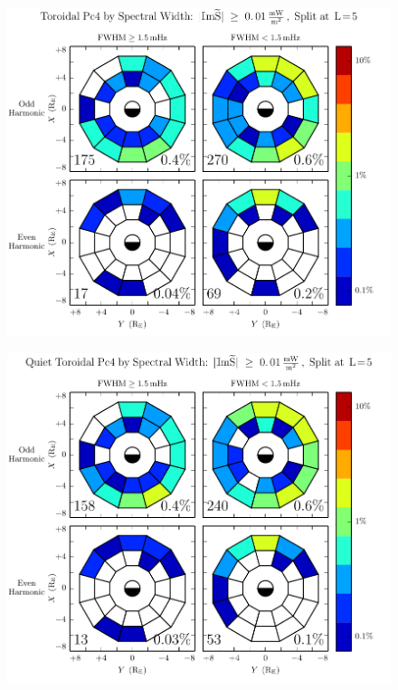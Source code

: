 \begin{figure}[!htb]
    \centering
    \includegraphics[width=\textwidth]{figures/fwhm_rate_t_all.pdf}
    \caption[Toroidal Pc4 Rate by Compressional Coupling]{
      \todo{$\cdots$}
    }
    \label{fig_fwhm_rate_t_all}
\end{figure}

\begin{figure}[!htb]
    \centering
    \includegraphics[width=\textwidth]{figures/fwhm_rate_t_calm.pdf}
    \caption[Toroidal Pc4 Rate by Compressional Coupling: Dst$\geq \SI{-30}{\nT}$]{
      \todo{$\cdots$}
    }
    \label{fig_fwhm_rate_t_calm}
\end{figure}


